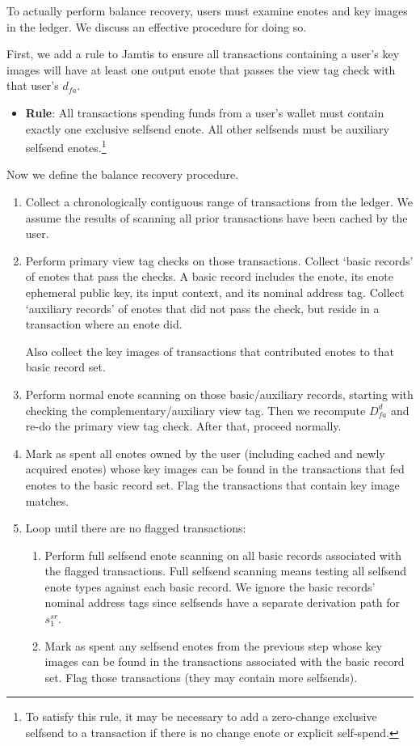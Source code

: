To actually perform balance recovery, users must examine enotes and key images in the ledger. We discuss an effective procedure for doing so.

First, we add a rule to Jamtis to ensure all transactions containing a user's key images will have at least one output enote that passes the view tag check with that user's $d_{fa}$.
\begin{itemize}
    \item \textbf{Rule}: All transactions spending funds from a user's wallet must contain exactly one exclusive selfsend enote. All other selfsends must be auxiliary selfsend enotes.\footnote{To satisfy this rule, it may be necessary to add a zero-change exclusive selfsend to a transaction if there is no change enote or explicit self-spend.}
\end{itemize}

Now we define the balance recovery procedure.
\begin{enumerate}
    \item Collect a chronologically contiguous range of transactions from the ledger. We assume the results of scanning all prior transactions have been cached by the user.

    \item Perform primary view tag checks on those transactions. Collect `basic records' of enotes that pass the checks. A basic record includes the enote, its enote ephemeral public key, its input context, and its nominal address tag. Collect `auxiliary records' of enotes that did not pass the check, but reside in a transaction where an enote did.

    Also collect the key images of transactions that contributed enotes to that basic record set.

    \item Perform normal enote scanning on those basic/auxiliary records, starting with checking the complementary/auxiliary view tag. Then we recompute $D^d_{fa}$ and re-do the primary view tag check. After that, proceed normally.

    \item Mark as spent all enotes owned by the user (including cached and newly acquired enotes) whose key images can be found in the transactions that fed enotes to the basic record set. Flag the transactions that contain key image matches.

    \item Loop until there are no flagged transactions:
    \begin{enumerate}
        \item Perform full selfsend enote scanning on all basic records associated with the flagged transactions. Full selfsend scanning means testing all selfsend enote types against each basic record. We ignore the basic records' nominal address tags since selfsends have a separate derivation path for $s^{sr}_1$.
        \item Mark as spent any selfsend enotes from the previous step whose key images can be found in the transactions associated with the basic record set. Flag those transactions (they may contain more selfsends).
    \end{enumerate}
\end{enumerate}

